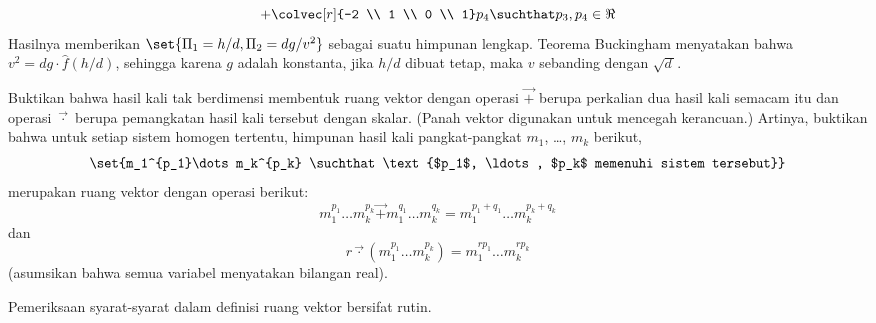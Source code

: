 \begin{exercises}
\begin{answer}
\begin{exparts}
\begin{equation*}
{                     +\colvec[r]{-2 \\ 1 \\ 0 \\ 1}p_4
                     \suchthat p_3,p_4\in\Re}
              \end{equation*}
              Hasilnya memberikan $\set{\Pi_1=h/d,\Pi_2=dg/v^2}$ sebagai
              suatu himpunan lengkap.
            \partsitem Teorema Buckingham menyatakan bahwa
              $v^2=dg\cdot\hat{f}(h/d)$, sehingga karena $g$ adalah konstanta,
              jika $h/d$ dibuat tetap, maka $v$ sebanding dengan $\sqrt{d\,}$.
          \end{exparts}
        \end{answer}
   \item \label{exer:DimLessProdsVecSp}
      Buktikan bahwa hasil kali tak berdimensi membentuk ruang vektor
      dengan operasi $\vec{+}$ berupa perkalian dua hasil kali semacam itu
      dan operasi $\vec{\cdot}$ berupa pemangkatan
      hasil kali tersebut dengan skalar.
      (Panah vektor digunakan untuk mencegah kerancuan.)
      Artinya, buktikan bahwa untuk setiap sistem homogen tertentu,
      himpunan hasil kali pangkat-pangkat $m_1$, \ldots, $m_k$ berikut,
      \begin{equation*}
        \set{m_1^{p_1}\dots m_k^{p_k}
             \suchthat 
              \text{$p_1$, \ldots, $p_k$ memenuhi sistem tersebut}}
      \end{equation*}
      merupakan ruang vektor dengan operasi berikut:
      \begin{equation*}
        m_1^{p_1}\dots m_k^{p_k}
        \vec{+}
        m_1^{q_1}\dots m_k^{q_k}
        =
        m_1^{p_1+q_1}\dots m_k^{p_k+q_k}
      \end{equation*}
      dan
      \begin{equation*}
        r\vec{\cdot} (m_1^{p_1}\dots m_k^{p_k})
        =
        m_1^{rp_1}\dots m_k^{rp_k}
      \end{equation*}
      (asumsikan bahwa semua variabel menyatakan bilangan real).
      \begin{answer}
        Pemeriksaan syarat-syarat dalam definisi ruang vektor bersifat
        rutin.
      \end{answer}

\end{exercises}
